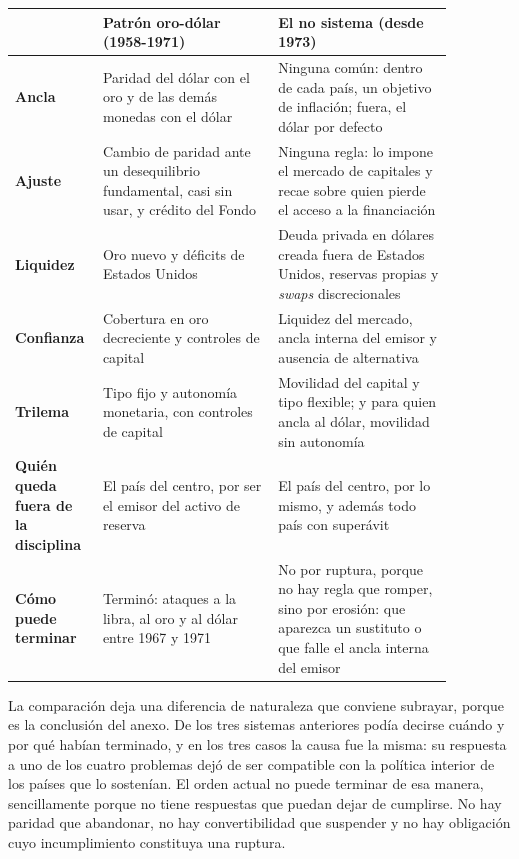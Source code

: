 \documentclass[10pt,a4paper]{article}
\newcounter{anexo}
\begin{document}
\begin{center}
{\footnotesize
\begin{tabular}{|p{0.13\linewidth}|p{0.37\linewidth}|p{0.37\linewidth}|}
\hline
 & \textbf{Patrón oro-dólar (1958-1971)} & \textbf{El no sistema (desde 1973)} \\
\hline
\textbf{Ancla} & Paridad del dólar con el oro y de las demás monedas con el dólar & Ninguna común: dentro de cada país, un objetivo de inflación; fuera, el dólar por defecto \\
\hline
\textbf{Ajuste} & Cambio de paridad ante un desequilibrio fundamental, casi sin usar, y crédito del Fondo & Ninguna regla: lo impone el mercado de capitales y recae sobre quien pierde el acceso a la financiación \\
\hline
\textbf{Liquidez} & Oro nuevo y déficits de Estados Unidos & Deuda privada en dólares creada fuera de Estados Unidos, reservas propias y \textit{swaps} discrecionales \\
\hline
\textbf{Confianza} & Cobertura en oro decreciente y controles de capital & Liquidez del mercado, ancla interna del emisor y ausencia de alternativa \\
\hline
\textbf{Trilema} & Tipo fijo y autonomía monetaria, con controles de capital & Movilidad del capital y tipo flexible; y para quien ancla al dólar, movilidad sin autonomía \\
\hline
\textbf{Quién queda fuera de la disciplina} & El país del centro, por ser el emisor del activo de reserva & El país del centro, por lo mismo, y además todo país con superávit \\
\hline
\textbf{Cómo puede terminar} & Terminó: ataques a la libra, al oro y al dólar entre 1967 y 1971 & No por ruptura, porque no hay regla que romper, sino por erosión: que aparezca un sustituto o que falle el ancla interna del emisor \\
\hline
\end{tabular}}
\end{center}

La comparación deja una diferencia de naturaleza que conviene subrayar, porque es la conclusión del anexo. De los tres sistemas anteriores podía decirse cuándo y por qué habían terminado, y en los tres casos la causa fue la misma: su respuesta a uno de los cuatro problemas dejó de ser compatible con la política interior de los países que lo sostenían. El orden actual no puede terminar de esa manera, sencillamente porque no tiene respuestas que puedan dejar de cumplirse. No hay paridad que abandonar, no hay convertibilidad que suspender y no hay obligación cuyo incumplimiento constituya una ruptura.
\end{document}
